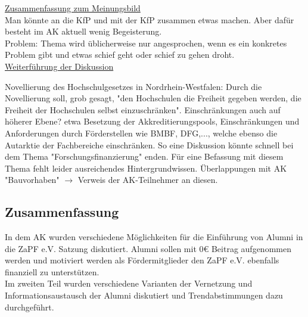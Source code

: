     \underline{Zusammenfassung zum Meinungsbild} \\
    Man könnte an die KfP und mit der KfP zusammen etwas machen. Aber dafür besteht im AK aktuell wenig Begeisterung. \\

    Problem: Thema wird üblicherweise nur angesprochen, wenn es ein konkretes Problem gibt und etwas schief geht oder schief zu gehen droht. \\

    \underline{Weiterführung der Diskussion}
    \begin{outline}
      \1 Novellierung des Hochschulgesetzes in Nordrhein-Westfalen: Durch die Novellierung soll, grob gesagt, "den Hochschulen die Freiheit gegeben werden, die Freiheit der Hochschulen selbst einzuschränken".
      \1 Einschränkungen auch auf höherer Ebene? etwa Besetzung der Akkreditierungspools, Einschränkungen und Anforderungen durch Förderstellen wie BMBF, DFG,..., welche ebenso die Autarktie der Fachbereiche einschränken.
        \2 So eine Diskussion könnte schnell bei dem Thema "Forschungsfinanzierung" enden.
        \2 Für eine Befassung mit diesem Thema fehlt leider ausreichendes Hintergrundwissen.
      \1 Überlappungen mit AK "Bauvorhaben" $\rightarrow$ Verweis der AK-Teilnehmer an diesen.
    \end{outline}

  \subsection*{Zusammenfassung}
    In dem AK wurden verschiedene Möglichkeiten für die Einführung von Alumni in die ZaPF e.V. Satzung diskutiert. Alumni sollen mit $0 \euro$ Beitrag aufgenommen werden und motiviert werden als Fördermitglieder den ZaPF e.V. ebenfalls finanziell zu unterstützen. \\
    Im zweiten Teil wurden verschiedene Varianten der Vernetzung und Informationsaustausch der Alumni diskutiert und Trendabstimmungen dazu durchgeführt.
